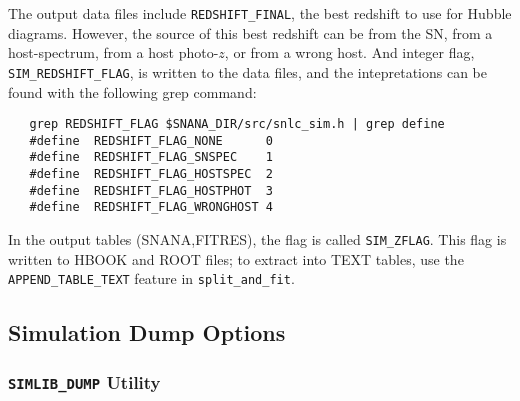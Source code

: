 \documentclass[12pt]{article}
\begin{document}
The output data files include {\tt REDSHIFT\_FINAL},
the best redshift to use for Hubble diagrams.
However, the source of this best redshift can be
from the SN, from a host-spectrum, from a host photo-$z$,
or from a wrong host. And integer flag, {\tt SIM\_REDSHIFT\_FLAG},
is written to the data files, and the intepretations can be
found with the following grep command:

\begin{verbatim}
   grep REDSHIFT_FLAG $SNANA_DIR/src/snlc_sim.h | grep define
   #define  REDSHIFT_FLAG_NONE      0
   #define  REDSHIFT_FLAG_SNSPEC    1 
   #define  REDSHIFT_FLAG_HOSTSPEC  2
   #define  REDSHIFT_FLAG_HOSTPHOT  3
   #define  REDSHIFT_FLAG_WRONGHOST 4
\end{verbatim}

In the output tables (SNANA,FITRES), the flag is called {\tt SIM\_ZFLAG}.
This flag is written to HBOOK and ROOT files; to extract into TEXT tables,
use the {\tt APPEND\_TABLE\_TEXT} feature in {\tt split\_and\_fit}.



  \clearpage
   \subsection{Simulation Dump Options}
   \label{subsec:dump_options}


   \subsubsection{{\tt SIMLIB\_DUMP} Utility }
   \label{sssec:simlib_dump}
\end{document}
